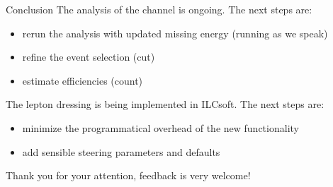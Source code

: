 \documentclass{beamer}
\newcommand{\figurepath}{../analysis/fig/}
\newcommand{\tripleFigDistance}{\vspace{-1.2em}}
\begin{document}
\begin{frame}{Conclusion}
The analysis of the \eeto\qqln channel is ongoing. The next steps are:
\begin{itemize}
\item rerun the analysis with updated missing energy (running as we speak)
\item refine the event selection (cut)
\item estimate efficiencies (count)
\end{itemize}


The lepton dressing is being implemented in ILCsoft. The next steps are:

\begin{itemize}
\item minimize the programmatical overhead of the new functionality
\item add sensible steering parameters and defaults
\end{itemize}


\vspace{1em}
Thank you for your attention, feedback is very welcome!
\end{frame}




\end{document}
